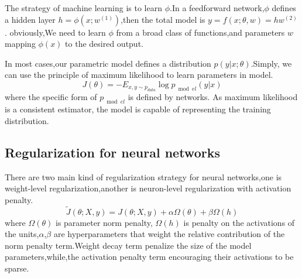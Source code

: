 The strategy of machine learning is to learn $\phi$.In a feedforward network,$\phi$ defines a hidden layer $h=\phi(x;w^{(1)})$,then the total model is $y=f(x;\theta,w)=hw^{(2)}$.
obviously,We need to learn $\phi$ from a broad class of functions,and parameters $w$ mapping $\phi(x)$ to the desired output.

In most cases,our parametric model defines a distribution $p(y|x;\theta)$.Simply, we can use the principle of maximum likelihood to learn parameters in model.
\begin{equation}
J(\theta ) =  - {E_{x,y \sim {p_{data}}}}\log {p_{\bmod el}}(y|x)
\end{equation}
where the specific form of $p_{\bmod el}$ is defined by networks.
As maximum likelihood is a consistent estimator, the model is capable of representing the training distribution.

\subsection{Regularization for neural networks}

There are two main kind of regularization strategy for neural networks,one is weight-level regularization,another is neuron-level regularization with activation penalty.
\begin{equation}
\tilde J(\theta ;X,y) = J(\theta ;X,y) + \alpha \Omega (\theta )+ \beta \Omega (h)
\end{equation}
where $\Omega (\theta )$ is parameter norm penalty, $\Omega (h)$ is penalty on the activations of the units,$\alpha$,$\beta$ are hyperparameters that weight the relative contribution of
the norm penalty term.Weight decay term penalize the size of the model parameters,while,the activation penalty term encouraging their activations to be sparse.


